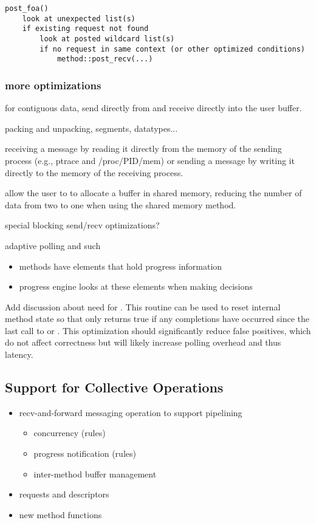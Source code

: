 \begin{verbatim}
post_foa()
    look at unexpected list(s)
    if existing request not found
        look at posted wildcard list(s)
        if no request in same context (or other optimized conditions)
            method::post_recv(...)
\end{verbatim}


\subsubsection{more optimizations}

for contiguous data, send directly from and receive directly into the
user buffer.

packing and unpacking, segments, datatypes...

receiving a message by reading it directly from the memory of the
sending process (e.g., ptrace and /proc/PID/mem) or sending a message
by writing it directly to the memory of the receiving process.

allow the user to  to allocate a buffer in shared
memory, reducing the number of data from two to one when using the
shared memory method.

special blocking send/recv optimizations?

adaptive polling and such
\begin{itemize}
\item methods have elements that hold progress information
\item progress engine looks at these elements when making decisions
\end{itemize}
  
\todo Add discussion about need for .  This routine
can be used to reset internal method state so that  only
returns true if any completions have occurred since the last call to
 or .  This optimization should
significantly reduce false positives, which do not affect correctness but will
likely increase polling overhead and thus latency.


\subsection{Support for Collective Operations}

\begin{itemize}
\item recv-and-forward messaging operation to support pipelining
  \begin{itemize}
  \item concurrency (rules)
  \item progress notification (rules)
  \item inter-method buffer management
  \end{itemize}
\item requests and descriptors
\item new method functions
\end{itemize}

